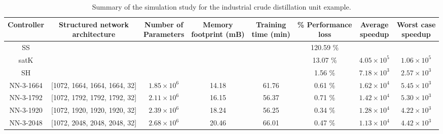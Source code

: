 \documentclass[preprint,5p, twocolumn, authoryear]{elsarticle}
\begin{document}
\begin{table}[t]
    \caption{Summary of the simulation study for the 
    industrial crude distillation unit example.}
\begin{tabular}{ |c|c|c|c|c|c|c|c| }
          \hline
          Controller & \thead{Structured network \\ architecture} & 
          \thead{Number of \\ Parameters} & 
          \thead{Memory \\ footprint (mB)} & \thead{Training \\ time (min)} &
          \thead{\% Performance\\ loss} & \thead{Average \\ speedup} & \thead{Worst case \\ speedup} \\
          \hline
      SS &  &  & &  & 120.59 \% &  & \\ 
  satK &  &  &   &  & 13.07 \% & $4.05 \times 10^5$ & $1.06 \times 10^5$ \\ 
  SH &  &  &  &  & 1.56 \% & $7.18 \times 10^3$  & $2.57 \times 10^3$ \\ 
  NN-3-1664 & [1072, 1664, 1664, 1664, 32] & $1.85 \times 10^6$ & 14.18 & 61.76 & 0.61 \% & $1.62 \times 10^4$ & $5.45 \times 10^3$  \\ 
  NN-3-1792 & [1072, 1792, 1792, 1792, 32]  & $2.11 \times 10^6$ & 16.15  & 56.37 & 0.71 \% & $1.42 \times 10^4$ & $5.30 \times 10^3$ \\ 
  NN-3-1920 & [1072, 1920, 1920, 1920, 32]  & $2.39 \times 10^6$ & 18.24  & 56.25 & 0.34 \% & $1.28 \times 10^4$ & $4.22 \times 10^3$ \\ 
  NN-3-2048 & [1072, 2048, 2048, 2048, 32]  & $2.68 \times 10^6$ & 20.46  & 66.01 & 0.47 \% & $1.13 \times 10^4$ & $4.42 \times 10^3$\\ 
\hline
\end{tabular}
\label{table:cdu}      
\end{table}
\end{document}
